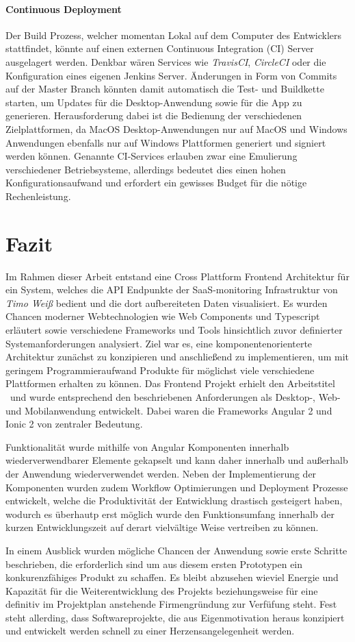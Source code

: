 \subsubsection{Continuous Deployment}

Der Build Prozess, welcher momentan Lokal auf dem Computer des Entwicklers stattfindet, könnte auf einen externen Continuous Integration (CI) Server ausgelagert werden.
Denkbar wären Services wie \emph{TravisCI}, \emph{CircleCI} oder die Konfiguration eines eigenen Jenkins Server.
Änderungen in Form von Commits auf der Master Branch könnten damit automatisch die Test- und Buildkette starten, um Updates für die Desktop-Anwendung sowie für die App zu generieren.
Herausforderung dabei ist die Bedienung der verschiedenen Zielplattformen, da MacOS Desktop-Anwendungen nur auf MacOS und
Windows Anwendungen ebenfalls nur auf Windows Plattformen generiert und signiert werden können.
Genannte CI-Services erlauben zwar eine Emulierung verschiedener Betriebsysteme,
allerdings bedeutet dies einen hohen Konfigurationsaufwand und erfordert ein gewisses Budget für die nötige Rechenleistung.


\chapter{Fazit}

Im Rahmen dieser Arbeit entstand eine Cross Plattform Frontend Architektur für ein System,
welches die API Endpunkte der SaaS-monitoring Infrastruktur von \emph{Timo Weiß} bedient und die dort aufbereiteten Daten visualisiert.
Es wurden Chancen moderner Webtechnologien wie Web Components und Typescript erläutert
sowie verschiedene Frameworks und Tools hinsichtlich zuvor definierter Systemanforderungen analysiert.
Ziel war es, eine komponentenorienterte Architektur zunächst zu konzipieren und anschließend zu implementieren, um
mit geringem Programmieraufwand Produkte für möglichst viele verschiedene Plattformen erhalten zu können.
Das Frontend Projekt erhielt den Arbeitstitel \projectname{} und wurde entsprechend den beschriebenen Anforderungen
als Desktop-, Web- und Mobilanwendung entwickelt. Dabei waren die Frameworks Angular 2 und Ionic 2 von zentraler Bedeutung.

Funktionalität wurde mithilfe von Angular Komponenten innerhalb wiederverwendbarer
Elemente gekapselt und kann daher innerhalb und außerhalb der Anwendung wiederverwendet werden.
Neben der Implementierung der Komponenten wurden zudem Workflow Optimierungen und Deployment Prozesse entwickelt,
welche die Produktivität der Entwicklung drastisch gesteigert haben, wodurch es überhautp erst möglich wurde den Funktionsumfang
innerhalb der kurzen Entwicklungszeit auf derart vielvältige Weise vertreiben zu können.

In einem Ausblick wurden mögliche Chancen der Anwendung sowie erste Schritte beschrieben, die erforderlich sind um aus diesem ersten
Prototypen ein konkurenzfähiges Produkt zu schaffen.
Es bleibt abzusehen wieviel Energie und Kapazität für die Weiterentwicklung des Projekts beziehungsweise für eine definitiv im Projektplan anstehende Firmengründung zur Verfüfung steht.
Fest steht allerding, dass Softwareprojekte, die aus Eigenmotivation heraus konzipiert und entwickelt werden schnell zu einer Herzensangelegenheit werden.
